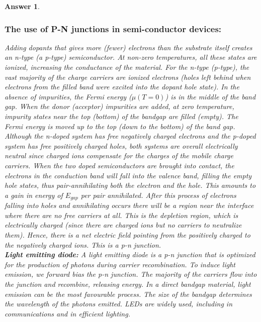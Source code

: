 \documentclass[a4paper]{article}
\newtheorem{ans}{Answer}[subsection]
\theoremstyle{new}
\begin{document}
\begin{ans}
\subsubsection*{The use of P-N junctions in semi-conductor devices:}
Adding dopants that gives more (fewer) electrons than the substrate itself creates an n-type (a p-type) semiconductor. At non-zero temperatures, all these states are ionized, increasing the conductance of the material. For the n-type (p-type), the vast majority of the charge carriers are ionized electrons (holes left behind when electrons from the filled band were excited into the dopant hole state). In the absence of impurities, the Fermi energy ($\mu(T=0)$) is in the middle of the band gap. When the donor (acceptor) impurities are added, at zero temperature, impurity states near the top (bottom) of the bandgap are filled (empty). The Fermi energy is moved up to the top (down to the bottom) of the band gap.\\[5pt]
Although the n-doped system has free negatively charged electrons and the p-doped system has free positively charged holes, both systems are overall electrically neutral since charged ions compensate for the charges of the mobile charge carriers. When the two doped semiconductors are brought into contact, the electrons in the conduction band will fall into the valence band, filling the empty hole states, thus pair-annihilating both the electron and the hole. This amounts to a gain in energy of $E_{gap}$ per pair annihilated. After this process of electrons falling into holes and annihilating occurs there will be a region near the interface where there are no free carriers at all. This is the depletion region, which is electrically charged (since there are charged ions but no carriers to neutralize them). Hence, there is a net electric field pointing from the positively charged to the negatively charged ions. This is a p-n junction.\\[5pt]
\textbf{Light emitting diode:} A light emitting diode is a p-n junction that is optimized for the production of photons during carrier recombination. To induce light emission, we forward bias the p-n junction. The majority of the carriers flow into the junction and recombine, releasing energy. In a direct bandgap material, light emission can be the most favourable process. The size of the bandgap determines the wavelength of the photons emitted. LEDs are widely used, including in communications and in efficient lighting.\\[5pt]

\end{ans}
\end{document}
